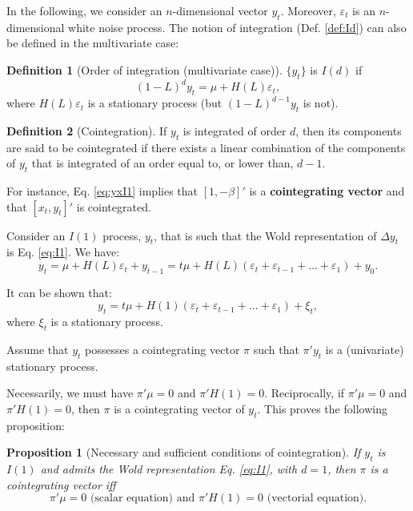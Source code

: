 \documentclass[
  12pt,
]{book}
\newtheorem{proposition}{Proposition}[chapter]
\theoremstyle{definition}
\newtheorem{definition}{Definition}[chapter]
\theoremstyle{definition}
\theoremstyle{definition}
\theoremstyle{definition}
\theoremstyle{remark}
\begin{document}
In the following, we consider an \(n\)-dimensional vector \(y_t\). Moreover, \(\varepsilon_t\) is an \(n\)-dimensional white noise process. The notion of integration (Def. \ref{def:Id}) can also be defined in the multivariate case:

\begin{definition}[Order of integration (multivariate case)]
\protect\hypertarget{def:Idmultivar}{}\label{def:Idmultivar}\(\{y_t\}\) is \(I(d)\) if
\begin{equation}
(1-L)^dy_t = \mu + H(L)\varepsilon_t,\label{eq:I1}
\end{equation}
where \(H(L)\varepsilon_t\) is a stationary process (but \((1-L)^{d-1}y_t\) is not).
\end{definition}

\begin{definition}[Cointegration]
\protect\hypertarget{def:cointegration}{}\label{def:cointegration}If \(y_t\) is integrated of order \(d\), then its components are said to be cointegrated if there exists a linear combination of the components of \(y_t\) that is integrated of an order equal to, or lower than, \(d-1\).
\end{definition}

For instance, Eq. \eqref{eq:yxI1} implies that \([1,-\beta]'\) is a \textbf{cointegrating vector} and that \([x_t,y_t]'\) is cointegrated.

Consider an \(I(1)\) process, \(y_t\), that is such that the Wold representation of \(\Delta y_t\) is Eq. \eqref{eq:I1}. We have:
\[
y_t = \mu + H(L)\varepsilon_t + y_{t-1} = t \mu + H(L)(\varepsilon_t + \varepsilon_{t-1} + \dots + \varepsilon_1) + y_0.
\]

It can be shown that:
\[
y_t = t \mu + H(1)(\varepsilon_t + \varepsilon_{t-1} + \dots + \varepsilon_1) + \xi_t,
\]
where \(\xi_t\) is a stationary process.

Assume that \(y_t\) possesses a cointegrating vector \(\pi\) such that \(\pi' y_t\) is a (univariate) stationary process.

Necessarily, we must have \(\pi' \mu = 0\) and \(\pi' H(1)=0\). Reciprocally, if \(\pi' \mu = 0\) and \(\pi' H(1)=0\), then \(\pi\) is a cointegrating vector of \(y_t\). This proves the following proposition:

\begin{proposition}[Necessary and sufficient conditions of cointegration]
\protect\hypertarget{prp:NScondCoint}{}\label{prp:NScondCoint}If \(y_t\) is \(I(1)\) and admits the Wold representation Eq. \eqref{eq:I1}, with \(d=1\), then \(\pi\) is a cointegrating vector iff
\[
\pi' \mu = 0 \mbox{ (scalar equation) and }\pi' H(1)=0\mbox{ (vectorial equation)}.
\]
\end{proposition}
\end{document}
